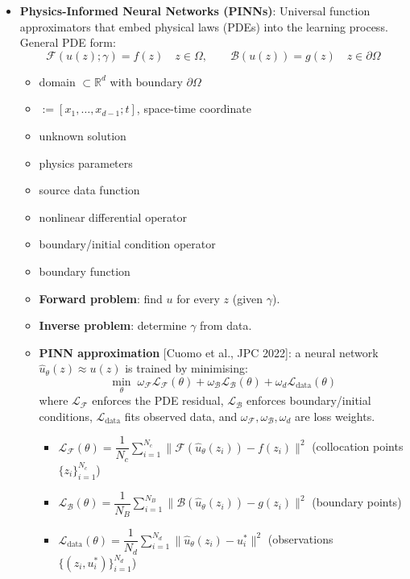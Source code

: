 \documentclass[UTF8]{ctexart}
\begin{document}
\begin{itemize}
    \item \textbf{Physics-Informed Neural Networks (PINNs)}: Universal function approximators that embed physical laws (PDEs) into the learning process. General PDE form:
    \[
        \mathcal{F}(u(z);\gamma) = f(z) \quad z \in \Omega, \qquad \mathcal{B}(u(z)) = g(z) \quad z \in \partial\Omega
    \]
    \begin{itemize}
        \item[$\Omega$:] domain $\subset \mathbb{R}^d$ with boundary $\partial\Omega$
        \item[$z$:] $:= [x_1,\ldots,x_{d-1};t]$, space-time coordinate
        \item[$u$:] unknown solution
        \item[$\gamma$:] physics parameters
        \item[$f$:] source data function
        \item[$\mathcal{F}$:] nonlinear differential operator
        \item[$\mathcal{B}$:] boundary/initial condition operator
        \item[$g$:] boundary function
    \end{itemize}

\newpage

    \begin{itemize}
        \item \textbf{Forward problem}: find $u$ for every $z$ (given $\gamma$).
        \item \textbf{Inverse problem}: determine $\gamma$ from data.
        \item \textbf{PINN approximation} [Cuomo et al., JPC 2022]: a neural network $\hat{u}_\theta(z) \approx u(z)$ is trained by minimising:
        \[
            \min_\theta\; \omega_\mathcal{F}\mathcal{L}_\mathcal{F}(\theta) + \omega_\mathcal{B}\mathcal{L}_\mathcal{B}(\theta) + \omega_d\mathcal{L}_{\mathrm{data}}(\theta)
        \]
        where $\mathcal{L}_\mathcal{F}$ enforces the PDE residual, $\mathcal{L}_\mathcal{B}$ enforces boundary/initial conditions, $\mathcal{L}_{\mathrm{data}}$ fits observed data, and $\omega_\mathcal{F},\omega_\mathcal{B},\omega_d$ are loss weights.
        \begin{itemize}
            \item $\mathcal{L}_\mathcal{F}(\theta) = \dfrac{1}{N_c}\displaystyle\sum_{i=1}^{N_c}\|\mathcal{F}(\hat{u}_\theta(z_i)) - f(z_i)\|^2$ \quad (collocation points $\{z_i\}_{i=1}^{N_c}$)
            \item $\mathcal{L}_\mathcal{B}(\theta) = \dfrac{1}{N_B}\displaystyle\sum_{i=1}^{N_B}\|\mathcal{B}(\hat{u}_\theta(z_i)) - g(z_i)\|^2$ \quad (boundary points)
            \item $\mathcal{L}_{\mathrm{data}}(\theta) = \dfrac{1}{N_d}\displaystyle\sum_{i=1}^{N_d}\|\hat{u}_\theta(z_i) - u_i^*\|^2$ \quad (observations $\{(z_i, u_i^*)\}_{i=1}^{N_d}$)
        \end{itemize}
    \end{itemize}


\end{itemize}
\end{document}
